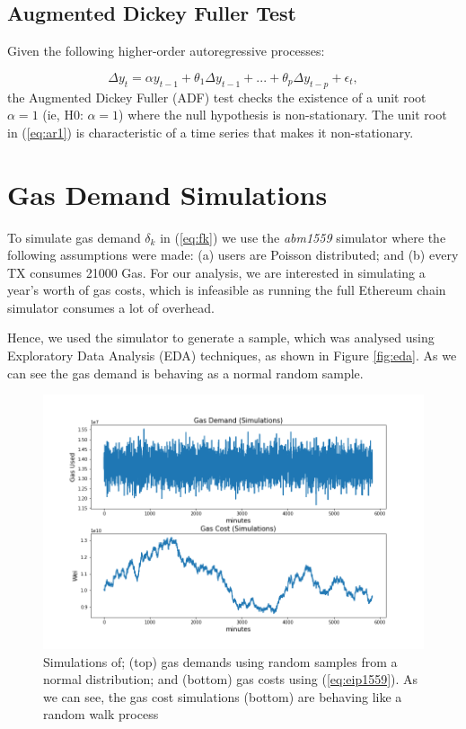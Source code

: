\documentclass{article}
\begin{document}
\subsection{Augmented Dickey Fuller Test}
\label{section:adf}

Given the following higher-order autoregressive processes:

\begin{equation}
\Delta y_{t} = \alpha y_{t-1} + \theta_{1} \Delta y_{t-1}  + ... + \theta_{p} \Delta y_{t-p} + \epsilon_{t},
\label{eq:ar1} 
\end{equation}
the Augmented Dickey Fuller (ADF) test checks the existence of a unit root $\alpha = 1$ (ie, H0: $\alpha = 1$) where the null hypothesis is non-stationary. The unit root in (\ref{eq:ar1}) is characteristic of a time series that makes it non-stationary.


\section{Gas Demand Simulations}
\label{section:gas_demand}

To simulate gas demand $\delta_{k}$ in (\ref{eq:fk}) we use the \textit{abm1559}  simulator \cite{Mon21} where the following assumptions were made: (a) users are Poisson distributed; and (b) every TX consumes 21000 Gas. For our analysis, we are interested in simulating a year's worth of gas costs, which is infeasible as running the full Ethereum chain simulator consumes a lot of overhead.

Hence, we used the simulator to generate a sample, which was analysed using Exploratory Data Analysis (EDA) techniques, as shown in Figure \ref{fig:eda}. As we can see the gas demand is behaving as a normal random sample. 

\begin{figure}
\centering
\includegraphics[width=5in]{gas.png}
\caption{Simulations of; (top) gas demands using random samples from a normal distribution; and (bottom) gas costs using (\ref{eq:eip1559}). As we can see, the gas cost simulations (bottom) are behaving like a random walk process} 
\label{fig:gas}
\end{figure} 
\end{document}
